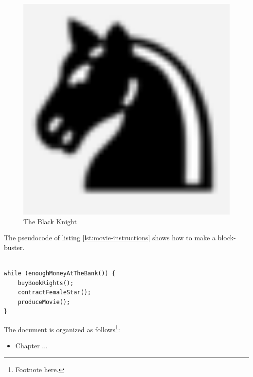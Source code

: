 \documentclass[11pt,twoside,a4paper,pagesize]{report}
\begin{document}
\begin{figure}[htbp]
    \centering
    \includegraphics[width=1.0\textwidth]{BlackKnight.png}
    \caption{The Black Knight}
    \label{fig:black-knight}
\end{figure}



The pseudocode of listing \ref{lst:movie-instructions} shows how to
make a block-buster.

\lstset{language=Java}
\begin{lstlisting}[float, frame=single, caption=How to make a block-buster, label=lst:movie-instructions]

while (enoughMoneyAtTheBank()) {
    buyBookRights();
    contractFemaleStar();
    produceMovie();
}
\end{lstlisting}


\clearpage

The document is organized as follows\footnote{Footnote here.}:
\begin{itemize}
\item Chapter ... 
\end{itemize}

\end{document}
